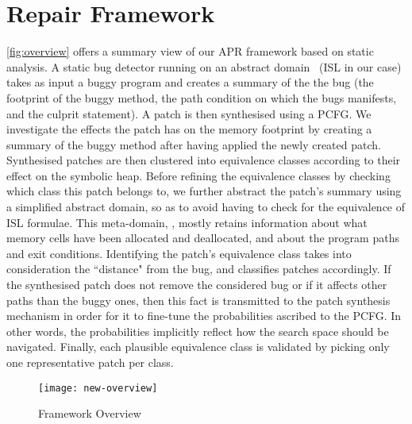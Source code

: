 \section{Repair Framework}
 
 \autoref{fig:overview} offers a summary view of our APR framework based on static analysis.
  A static bug detector running on an abstract domain \domaindetect~(ISL in our case)
  takes as input a buggy program and creates a summary of the 
   the bug (the footprint of the buggy method, the path condition on which the bugs manifests, and the culprit statement). 
   A patch is then synthesised using a PCFG. We investigate the effects the patch has on the memory footprint by creating a summary of the buggy method after having applied the newly created patch. 
   Synthesised patches are then clustered into equivalence classes according to their effect on the symbolic heap. 
   Before refining the equivalence classes by checking which class this patch belongs to, we further abstract the patch's summary using a simplified abstract domain, so as to avoid having to check for the equivalence of ISL formulae. This meta-domain, \domainequiv, mostly retains information about what memory cells have been allocated and deallocated, and about the program paths and exit conditions. 
   Identifying the patch's equivalence class takes into consideration the ``distance" from the bug, and classifies patches accordingly. 
   If the synthesised patch does not remove the considered bug or if it affects other paths than the buggy ones, then this fact is transmitted to the patch synthesis mechanism  in order for it to fine-tune the probabilities ascribed to the PCFG. In other words, the probabilities implicitly reflect how the search space should be navigated. 
   Finally, each plausible equivalence class is validated by picking only one representative patch per class.
   

\begin{figure}[t]
\centering
\texttt{[image: new-overview]}
\caption{Framework Overview}\vspace{-2em}
\label{fig:overview}
\end{figure}

